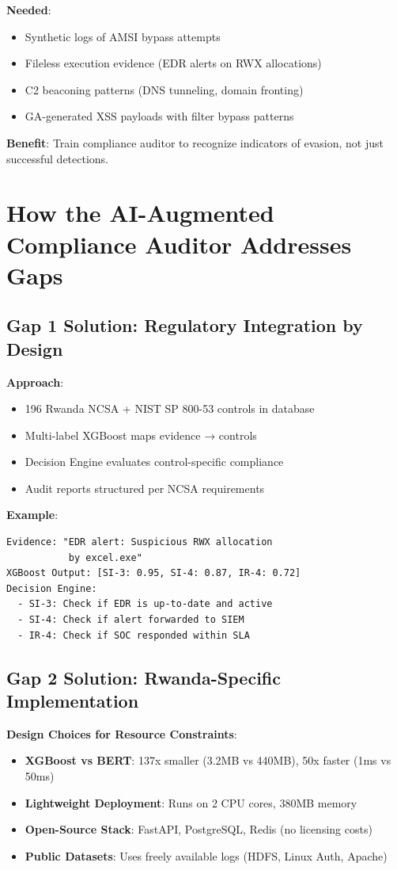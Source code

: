 \documentclass[11pt,conference]{IEEEtran}
\begin{document}
\textbf{Needed}:
\begin{itemize}
    \item Synthetic logs of AMSI bypass attempts
    \item Fileless execution evidence (EDR alerts on RWX allocations)
    \item C2 beaconing patterns (DNS tunneling, domain fronting)
    \item GA-generated XSS payloads with filter bypass patterns
\end{itemize}

\textbf{Benefit}: Train compliance auditor to recognize indicators of evasion, not just successful detections.

\section{How the AI-Augmented Compliance Auditor Addresses Gaps}

\subsection{Gap 1 Solution: Regulatory Integration by Design}

\textbf{Approach}:
\begin{itemize}
    \item 196 Rwanda NCSA + NIST SP 800-53 controls in database
    \item Multi-label XGBoost maps evidence → controls
    \item Decision Engine evaluates control-specific compliance
    \item Audit reports structured per NCSA requirements
\end{itemize}

\textbf{Example}:
\begin{verbatim}
Evidence: "EDR alert: Suspicious RWX allocation
           by excel.exe"
XGBoost Output: [SI-3: 0.95, SI-4: 0.87, IR-4: 0.72]
Decision Engine:
  - SI-3: Check if EDR is up-to-date and active
  - SI-4: Check if alert forwarded to SIEM
  - IR-4: Check if SOC responded within SLA
\end{verbatim}

\subsection{Gap 2 Solution: Rwanda-Specific Implementation}

\textbf{Design Choices for Resource Constraints}:
\begin{itemize}
    \item \textbf{XGBoost vs BERT}: 137x smaller (3.2MB vs 440MB), 50x faster (1ms vs 50ms)
    \item \textbf{Lightweight Deployment}: Runs on 2 CPU cores, 380MB memory
    \item \textbf{Open-Source Stack}: FastAPI, PostgreSQL, Redis (no licensing costs)
    \item \textbf{Public Datasets}: Uses freely available logs (HDFS, Linux Auth, Apache)
\end{itemize}
\end{document}
